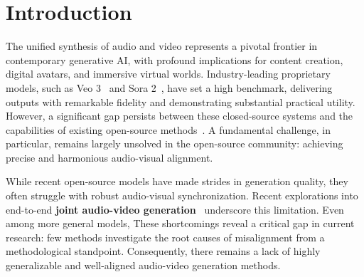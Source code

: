 \section{Introduction}
\label{sec:intro}

The unified synthesis of audio and video represents a pivotal frontier in contemporary generative AI, with profound implications for content creation, digital avatars, and immersive virtual worlds. Industry-leading proprietary models, such as Veo 3~\cite{veo3_website} and Sora 2~\cite{sora2_website}, have set a high benchmark, delivering outputs with remarkable fidelity and demonstrating substantial practical utility. However, a significant gap persists between these closed-source systems and the capabilities of existing open-source methods~\cite{shan2025hunyuanfoley,cheng2025mmaudio,peng2025omnisync}. A fundamental challenge, in particular, remains largely unsolved in the open-source community: achieving precise and harmonious audio-visual alignment.

While recent open-source models have made strides in generation quality, they often struggle with robust audio-visual synchronization. Recent explorations into end-to-end \textbf{joint audio-video generation}~\cite{liu2025javisdit,ruan2023mmdiffusion,ishii2024simple,haji2024av,low2025ovi,wang2025universe} underscore this limitation.
Even among more general models, 
These shortcomings reveal a critical gap in current research: few methods investigate the root causes of  misalignment from a methodological standpoint. 
Consequently, there remains a lack of highly generalizable and well-aligned audio-video  generation methods.



